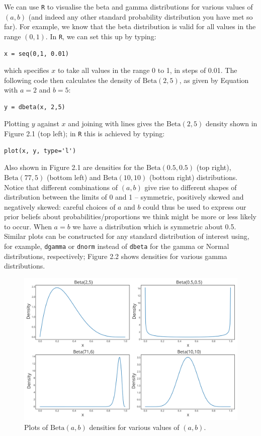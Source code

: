 \noindent We can use \texttt{R} to visualise the beta and gamma distributions for various values of $(a,b)$ (and indeed any other standard probability distribution you have met so far).  For example, we know that the beta distribution is valid for all values in the range $(0,1)$.  In \texttt{R}, we can set this up by typing:
\begin{verbatim}
x = seq(0,1, 0.01)
\end{verbatim}
which specifies $x$ to take all values in the range 0 to 1, in steps of 0.01.  The following code then calculates the density of $\mathrm{Beta}(2,5)$, as given by Equation  with $a=2$ and $b=5$:
\begin{verbatim}
y = dbeta(x, 2,5)
\end{verbatim}
Plotting $y$ against $x$ and joining with lines gives the $\mathrm{Beta}(2,5)$ density shown in Figure 2.1 (top left); in \texttt{R} this is achieved by typing:
\begin{verbatim}
plot(x, y, type='l')
\end{verbatim}
\noindent Also shown in Figure 2.1 are densities for the $\mathrm{Beta}(0.5,0.5)$ (top right), $\mathrm{Beta}(77,5)$ (bottom left) and  $\mathrm{Beta}(10,10)$ (bottom right) distributions.  Notice that different combinations of $(a,b)$ give rise to different shapes of distribution between the limits of 0 and 1 -- symmetric, positively skewed and negatively skewed: careful choices of $a$ and $b$ could thus be used to express our prior beliefs about probabilities/proportions we think might be more or less likely to occur.  When $a=b$ we have a distribution which is symmetric about 0.5.  Similar plots can be constructed for any standard distribution of interest using, for example, \texttt{dgamma} or \texttt{dnorm} instead of \texttt{dbeta} for the gamma or Normal distributions, respectively; Figure 2.2 shows densities for various gamma distributions.

\begin{figure}[!h]
\centering
\includegraphics{images/betaplot1.svg}
\caption{Plots of $\mathrm{Beta}(a,b)$ densities for various values of $(a,b)$.}
\label{fig:betaplot1}
\end{figure}



